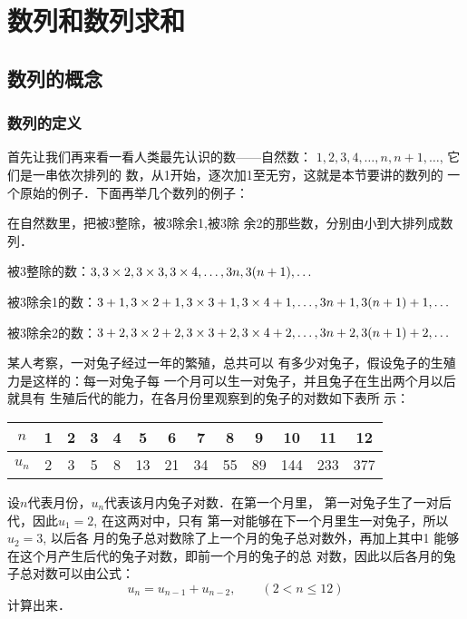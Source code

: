 \chapter{数列和数列求和}

\section{数列的概念}
\subsection{数列的定义}

首先让我们再来看一看人类最先认识的数——自然数：
$1,2,3,4,\ldots,n,n+1,\ldots$, 它们是一串依次排列的
数，从1开始，逐次加1至无穷，这就是本节要讲的数列的
一个原始的例子．下面再举几个数列的例子：

\begin{example}
    在自然数里，把被3整除，被3除余1,被3除
余2的那些数，分别由小到大排列成数列．
\end{example}

\begin{solution}
    被3整除的数：$3,3\times2,3\times3,3\times4,\ldots,3n,3(n+1),\ldots$

被3除余1的数：$3+1,3\times2+1,3\times3+1,3\times4+1,\ldots,3n+1,3(n+1)+1,\ldots$

被3除余2的数：$3+2,3\times2+2,3\times3+2,3\times4+2,\ldots , 3n+2,3(n+1) +2,\ldots$
\end{solution}

\begin{example}
    某人考察，一对兔子经过一年的繁殖，总共可以
有多少对兔子，假设兔子的生殖力是这样的：每一对兔子每
一个月可以生一对兔子，并且兔子在生出两个月以后就具有
生殖后代的能力，在各月份里观察到的兔子的对数如下表所
示：
\begin{center}
\begin{tabular}{c|cccccccccccc}
\hline
$n$&1&2&3&4&5&6&7&8&9&10&11&12\\
\hline
$u_n$&2&3&5&8&13&21&34&55&89&144&233&377\\
\hline
\end{tabular}
\end{center}

设$n$代表月份，$u_n$代表该月内兔子对数．在第一个月里，
第一对兔子生了一对后代，因此$u_1=2$, 在这两对中，只有
第一对能够在下一个月里生一对兔子，所以$u_2=3$, 以后各
月的兔子总对数除了上一个月的兔子总对数外，再加上其中1
能够在这个月产生后代的兔子对数，即前一个月的兔子的总
对数，因此以后各月的兔子总对数可以由公式：
\[u_n=u_{n-1}+u_{n-2},\qquad (2<n\le 12)\]
计算出来．
\end{example}

